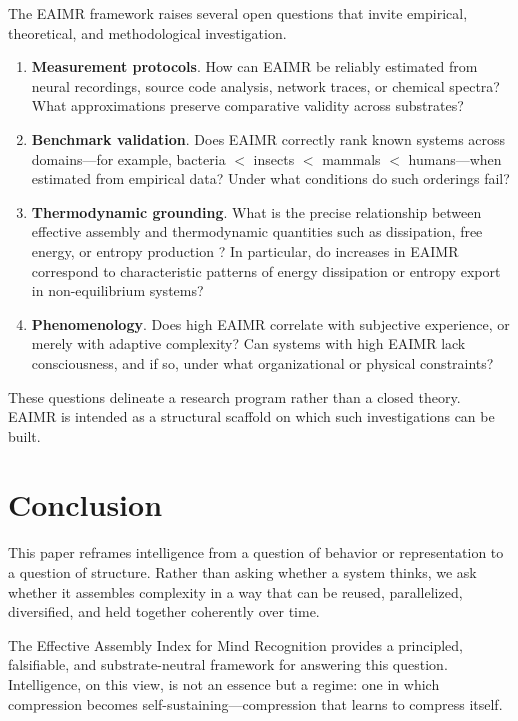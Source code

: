 \documentclass[11pt,letterpaper]{article}
\begin{document}
The EAIMR framework raises several open questions that invite empirical, theoretical, and methodological investigation.

\begin{enumerate}
\item \textbf{Measurement protocols}. How can EAIMR be reliably estimated from neural recordings, source code analysis, network traces, or chemical spectra? What approximations preserve comparative validity across substrates?

\item \textbf{Benchmark validation}. Does EAIMR correctly rank known systems across domains—for example, bacteria $<$ insects $<$ mammals $<$ humans—when estimated from empirical data? Under what conditions do such orderings fail?

\item \textbf{Thermodynamic grounding}. What is the precise relationship between effective assembly and thermodynamic quantities such as dissipation, free energy, or entropy production \parencite{landauer1961}? In particular, do increases in EAIMR correspond to characteristic patterns of energy dissipation or entropy export in non-equilibrium systems?

\item \textbf{Phenomenology}. Does high EAIMR correlate with subjective experience, or merely with adaptive complexity? Can systems with high EAIMR lack consciousness, and if so, under what organizational or physical constraints?
\end{enumerate}

These questions delineate a research program rather than a closed theory. EAIMR is intended as a structural scaffold on which such investigations can be built.

\section{Conclusion}

This paper reframes intelligence from a question of behavior or representation to a question of structure. Rather than asking whether a system thinks, we ask whether it assembles complexity in a way that can be reused, parallelized, diversified, and held together coherently over time.

The Effective Assembly Index for Mind Recognition provides a principled, falsifiable, and substrate-neutral framework for answering this question. Intelligence, on this view, is not an essence but a regime: one in which compression becomes self-sustaining—compression that learns to compress itself.
\end{document}
